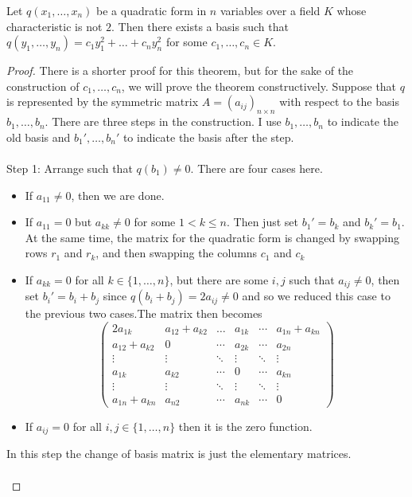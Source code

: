\documentclass[a4paper]{article}
\begin{document}
\begin{thm}{}{} Let $q(x_1,\dots,x_n)$ be a quadratic form in $n$ variables over a field $K$ whose characteristic is not $2$. Then there exists a basis such that $q(y_1,\dots,y_n)=c_1y_1^2+\dots+c_ny_n^2$ for some $c_1,\dots,c_n\in K$. \tcbline
\begin{proof}
There is a shorter proof for this theorem, but for the sake of the construction of $c_1,\dots,c_n$, we will prove the theorem constructively. Suppose that $q$ is represented by the symmetric matrix $A=(a_{ij})_{n\times n}$ with respect to the basis $b_1,\dots,b_n$. There are three steps in the construction. I use $b_1,\dots,b_n$ to indicate the old basis and $b_1',\dots,b_n'$ to indicate the basis after the step. \\~\\
Step 1: Arrange such that $q(b_1)\neq 0$. There are four cases here. 
\begin{itemize}
\item If $a_{11}\neq 0$, then we are done. 
\item If $a_{11}=0$ but $a_{kk}\neq 0$ for some $1<k\leq n$. Then just set $b_1'=b_k$ and $b_k'=b_1$. At the same time, the matrix for the quadratic form is changed by swapping rows $r_1$ and $r_k$, and then swapping the columns $c_1$ and $c_k$
\item If $a_{kk}=0$ for all $k\in\{1,\dots,n\}$, but there are some $i,j$ such that $a_{ij}\neq 0$, then set $b_i'=b_i+b_j$ since $q(b_i+b_j)=2a_{ij}\neq 0$ and so we reduced this case to the previous two cases.The matrix then becomes $$\begin{pmatrix}
2a_{1k} & a_{12}+a_{k2} & \dots & a_{1k} & \cdots & a_{1n}+a_{kn} \\
 a_{12}+a_{k2} & 0 & \cdots & a_{2k} & \cdots & a_{2n} \\
\vdots & \vdots & \ddots & \vdots & \ddots & \vdots \\
a_{1k} & a_{k2} & \cdots & 0 & \cdots & a_{kn}\\
\vdots & \vdots & \ddots & \vdots & \ddots & \vdots \\
a_{1n}+a_{kn} & a_{n2} & \cdots & a_{nk} & \cdots & 0
\end{pmatrix}$$
\item If $a_{ij}=0$ for all $i,j\in\{1,\dots,n\}$ then it is the zero function. 
\end{itemize}
In this step the change of basis matrix is just the elementary matrices. \\~\\


\end{proof}
\end{thm}
\end{document}
